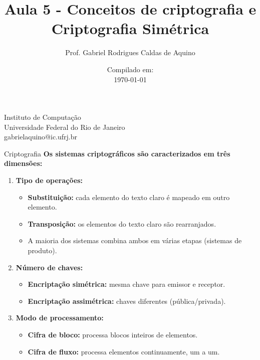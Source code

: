 \title{Aula 5 - Conceitos de criptografia e Criptografia Simétrica}

\author{Prof. Gabriel Rodrigues Caldas de Aquino}

\institute
{
    Instituto de Computação \\
    Universidade Federal do Rio de Janeiro\\
    gabrielaquino@ic.ufrj.br %
}
\date{Compilado em: \\ \today} %



\begin{frame}
    \titlepage
\end{frame}

\begin{frame}{Criptografia}
\textbf{Os sistemas criptográficos são caracterizados em três dimensões:}

\begin{enumerate}
    \item \textbf{Tipo de operações:}  
    \begin{itemize}
        \item \textbf{Substituição:} cada elemento do texto claro é mapeado em outro elemento.  
        \item \textbf{Transposição:} os elementos do texto claro são rearranjados.  
        \item A maioria dos sistemas combina ambos em várias etapas (sistemas de produto).  
    \end{itemize}

    \item \textbf{Número de chaves:}  
    \begin{itemize}
        \item \textbf{Encriptação simétrica:} mesma chave para emissor e receptor.  
        \item \textbf{Encriptação assimétrica:} chaves diferentes (pública/privada).  
    \end{itemize}

    \item \textbf{Modo de processamento:}  
    \begin{itemize}
        \item \textbf{Cifra de bloco:} processa blocos inteiros de elementos.  
        \item \textbf{Cifra de fluxo:} processa elementos continuamente, um a um.  
    \end{itemize}
\end{enumerate}
\end{frame}




